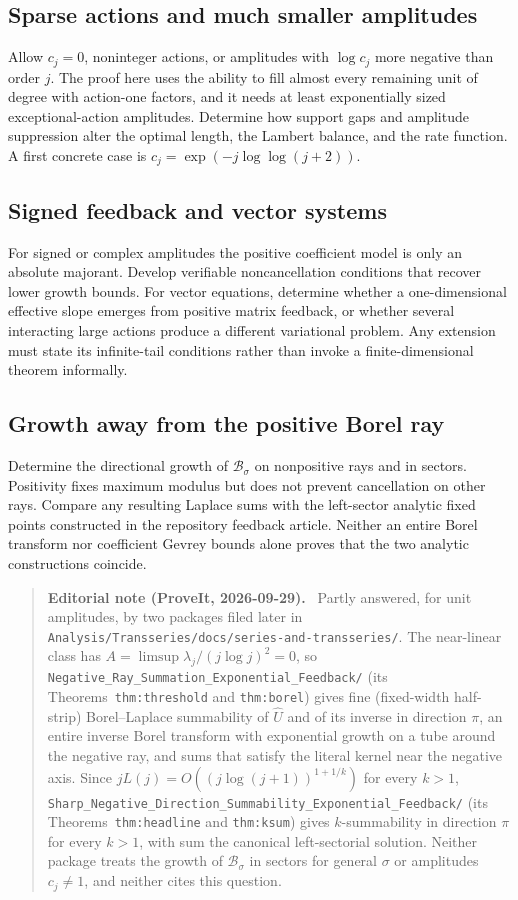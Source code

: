 \documentclass[11pt,a4paper]{article}
\numberwithin{equation}{section}
\theoremstyle{definition}
\theoremstyle{remark}
\newcommand{\Uhat}{\widehat U}
\newcommand{\Bcal}{\mathcal B}
\newenvironment{ednote}{\par\smallskip\begin{quote}\small\raggedright\textbf{Editorial note (ProveIt, 2026-09-29).}\ }{\end{quote}\smallskip}
\begin{document}
\subsection{Sparse actions and much smaller amplitudes}
Allow $c_j=0$, noninteger actions, or amplitudes with
$\log c_j$ more negative than order $j$. The proof here uses the ability
to fill almost every remaining unit of degree with action-one factors,
and it needs at least exponentially sized exceptional-action amplitudes.
Determine how support gaps and amplitude suppression alter the optimal
length, the Lambert balance, and the rate function. A first concrete
case is $c_j=\exp(-j\log\log(j+2))$.

\subsection{Signed feedback and vector systems}
For signed or complex amplitudes the positive coefficient model is only
an absolute majorant. Develop verifiable noncancellation conditions that
recover lower growth bounds. For vector equations, determine whether a
one-dimensional effective slope emerges from positive matrix feedback,
or whether several interacting large actions produce a different
variational problem. Any extension must state its infinite-tail
conditions rather than invoke a finite-dimensional theorem informally.

\subsection{Growth away from the positive Borel ray}
Determine the directional growth of $\Bcal_\sigma$ on nonpositive rays
and in sectors. Positivity fixes maximum modulus but does not prevent
cancellation on other rays. Compare any resulting Laplace sums with the
left-sector analytic fixed points constructed in the repository feedback
article. Neither an entire Borel transform nor coefficient Gevrey bounds
alone proves that the two analytic constructions coincide.
\begin{ednote}
Partly answered, for unit amplitudes, by two packages filed later in
\nolinkurl{Analysis/Transseries/docs/series-and-transseries/}. The
near-linear class has $A=\limsup\lambda_j/(j\log j)^2=0$, so
\nolinkurl{Negative_Ray_Summation_Exponential_Feedback/}
(its Theorems~\texttt{thm:threshold} and \texttt{thm:borel}) gives fine (fixed-width
half-strip) Borel--Laplace summability of $\Uhat$ and of its inverse in
direction $\pi$, an entire inverse Borel transform with exponential growth
on a tube around the negative ray, and sums that satisfy the literal kernel
near the negative axis. Since $jL(j)=O((j\log(j+1))^{1+1/k})$ for every
$k>1$,
\nolinkurl{Sharp_Negative_Direction_Summability_Exponential_Feedback/}
(its Theorems~\texttt{thm:headline} and \texttt{thm:ksum}) gives $k$-summability in direction
$\pi$ for every $k>1$, with sum the canonical left-sectorial solution.
Neither package treats the growth of $\Bcal_\sigma$ in sectors for general
$\sigma$ or amplitudes $c_j\ne1$, and neither cites this question.
\end{ednote}
\end{document}
